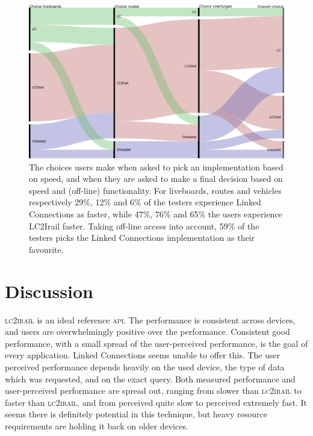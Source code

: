 \documentclass[twocolumn]{phdsymp} %
\begin{document}
\begin{figure}[ht]
	\begin{center}
		\includegraphics[width=.40\textwidth]{images/alluvial_user_choice_en.eps}
		\caption{\label{fig:choices} The choices users make when asked to pick an implementation based on speed, and when they are asked to make a final decision based on speed and (off-line) functionality. For liveboards, routes and vehicles respectively 29\%, 12\% and 6\% of the testers experience Linked Connections as faster, while 47\%, 76\% and 65\% the users experience LC2Irail faster. Taking off-line access into account, 59\% of the testers picks the Linked Connections implementation as their favourite.  }
	\end{center}
\end{figure}


\section{Discussion}
\textsc{lc2irail} is an ideal reference \textsc{api}. The performance is consistent across devices, and users are overwhelmingly positive over the performance. Consistent good performance, with a small spread of the user-perceived performance, is the goal of every application. Linked Connections seems unable to offer this. The user perceived performance depends heavily on the used device, the type of data which was requested, and on the exact query. Both measured performance and user-perceived performance are spread out, ranging from slower than \textsc{lc2irail} to faster than \textsc{lc2irail}, and from perceived quite slow to perceived extremely fast. It seems there is definitely potential in this technique, but heavy resource requirements are holding it back on older devices.
\end{document}
